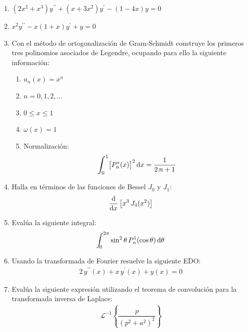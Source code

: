 \documentclass[hidelinks,12pt]{article}
\newcommand{\ptilde}[1]{\ensuremath{{#1}^{\prime}}}
\newcommand{\stilde}[1]{\ensuremath{{#1}^{\prime \prime}}}
\newcommand{\pderivada}[1]{\ensuremath{{#1}^{\prime}}}
\newcommand{\sderivada}[1]{\ensuremath{{#1}^{\prime \prime}}}
\def\scaleint#1{\vcenter{\hbox{\scaleto[3ex]{\displaystyle\int}{#1}}}}
\def\bs{\mkern-12mu}
\begin{document}
\begin{enumerate}[resume]
\item $(2 x^{2} + x^{3}) \stilde{y} + (x + 3 x^{2}) \ptilde{y} - (1 - 4 x) y = 0$
\item $x^{2} \stilde{y} - x (1 + x) \ptilde{y} + y = 0$
\item Con el método de ortogonalización de Gram-Schmidt construye los primeros tres polinomios asociados de Legendre, ocupando para ello la siguiente información:
\begin{enumerate}[label=\alph*)]
\item $u_{n}(x) = x^{n}$
\item $n = 0, 1, 2, \ldots$
\item $0 \leq x \leq 1$
\item $\omega (x) = 1$
\item Normalización:
\begin{align*}
\scaleint{6ex}_{\bs 0}^{1} \big[ P_{n}^{*} (x) \big]^{2} \dd{x} = \dfrac{1}{2 \, n + 1}
\end{align*}
\end{enumerate}
\item Halla en términos de las funciones de Bessel $J_{0}$ y $J_{1}$:
\begin{align*}
    \dv{x} \left[ x^{3} \, J_{4} (x^{2}) \right]
\end{align*}
\item Evalúa la siguiente integral:
\begin{align*}
\scaleint{5ex}_{\bs 0}^{2 \pi} \sin^{2} \theta \, P_{n}^{1} (\cos \theta) \dd{\theta}
\end{align*}
\item Usando la transformada de Fourier resuelve la siguiente EDO:
\begin{align*}
    2 \, \sderivada{y} (x) +  x \, \pderivada{y} (x) + y (x) = 0
\end{align*}
\item Evalúa la siguiente expresión utilizando el teorema de convolución para la transformada inversa de Laplace:
\begin{align*}
    \mathcal{L}^{-1} \left\{ \dfrac{p}{(p^{2} + a^{2})^{2}} \right\}
\end{align*}
\end{enumerate}
\end{document}

